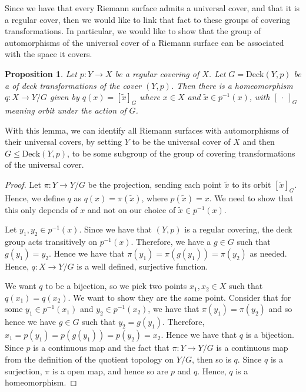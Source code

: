\documentclass[11pt]{report}
\newtheorem{prop}[thm]{Proposition}
\theoremstyle{definition}
\begin{document}
Since we have that every Riemann surface admits a universal cover, and that it is a regular cover, then we would like to link that fact to these groups of covering transformations. In particular, we would like to show that the group of automorphisms of the universal cover of a Riemann surface can be associated with the space it covers.
\begin{prop}
  Let $p:Y \rightarrow X$ be a regular covering of $X$. Let $G = \text{Deck}(Y,p)$ be a of deck transformations of the cover $(Y,p)$. Then there is a homeomorphism $q:X\rightarrow Y/G$ given by $q(x)=[\tilde{x}]_G$ where $x \in X$ and $\tilde{x} \in p^{-1}(x)$, with $[\: \cdot \: ]_G$ meaning orbit under the action of $G$. 
\end{prop}
With this lemma, we can identify all Riemann surfaces with automorphisms of their universal covers, by setting $Y$ to be the universal cover of $X$ and then $G \leq \text{Deck}(Y,p)$, to be some subgroup of the group of covering transformations of the universal cover.
\begin{proof}
  Let $\pi : Y \rightarrow Y/G$ be the projection, sending each point $\tilde{x}$ to its orbit $[\tilde{x}]_G$. Hence, we define $q$ as $q(x) = \pi(\tilde{x})$, where $p(\tilde{x})=x$. We need to show that this only depends of $x$ and not on our choice of $\tilde{x} \in p^{-1}(x)$. 
  
  Let $y_1,y_2 \in p^{-1}(x)$. Since we have that $(Y,p)$ is a regular covering, the deck group acts transitively on $p^{-1}(x)$. Therefore, we have a $g \in G$ such that $g(y_1) = y_2$. Hence we have that $\pi(y_1) = \pi(g(y_1))=\pi(y_2)$ as needed. Hence, $q:X \rightarrow Y/G$ is a well defined, surjective function. 
  
  We want $q$ to be a bijection, so we pick two points $x_1,x_2 \in X$ such that $q(x_1)=q(x_2)$. We want to show they are the same point. Consider that for some $y_1 \in p^{-1}(x_1)$ and $y_2 \in p^{-1}(x_2)$, we have that $\pi(y_1) = \pi(y_2)$ and so hence we have $g \in G$ such that $y_2 = g(y_1)$. Therefore, $x_1 = p(y_1) = p(g(y_1))=p(y_2)=x_2$. Hence we have that $q$ is a bijection. Since $p$ is a continuous map and the fact that $\pi:Y \rightarrow Y/G$ is a continuous map from the definition of the quotient topology on $Y/G$, then so is $q$. Since $q$ is a surjection, $\pi$ is a open map, and hence so are $p$ and $q$. Hence, $q$ is a homeomorphism.
\end{proof}
\end{document}
